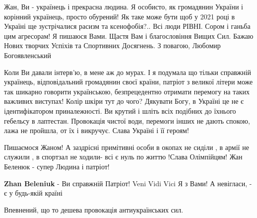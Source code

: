\begin{itemize}
Жан, Ви - українець і прекрасна людина. Я особисто, як громадянин України і
корінний українець, просто обурений! Як таке може бути щоб у 2021 році в
Україні ще зустрічалися расизм та ксенофобія?.. Всі люди РІВНІ. Сором і ганьба
цим агресорам! Я пишаюся Вами. Щастя Вам і благословіння Вищих Сил. Бажаю Нових
творчих Успіхів та Спортивних Досягнень. З повагою, Любомир Богоявленський

 

Коли Ви давали інтерв’ю, в мене аж до мурах. І я подумала що тільки справжній
українець, відповідальний громадянин своєї країни, патріот з великої літери
може так шикарно говорити українською, безпрецедентно отримати перемогу на
таких важливих виступах! Колір шкіри тут до чого? Дякувати Богу, в Україні це
не є ідентифікатором приналежності. Ви крутий і шліть всіх подібних до їхнього
гебельсу в лаптестан. Провокація чистої води, перемоги інших не дають спокою,
лажа не пройшла, от їх і викручує. Слава Україні і її героям!


 

Пишаємося Жаном! А заздрісні примітивні особи в окопах не сиділи , в армії не
служили , в спортзал не ходили- всі є нуль по життю !Слава Олімпійцям! Жан
Беленюк - супер Людина і патріот!


 
\textbf{Zhan Beleniuk} - Ви справжній Патріот! Veni Vidi Vici Я з Вами! А невігласи, - є у будь-якій країні

 

Впевнений, що то дешева провокація антиукраїнських сил.


\end{itemize}
